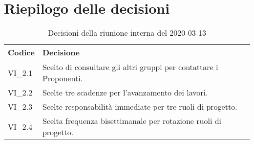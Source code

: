 \section{Riepilogo delle decisioni}
\begin{longtable}{ 
	 >{\centering}p{} >{}p{} }
	
	\caption{Decisioni della riunione interna del 2020-03-13}\\	
	
	\textbf{\color{white}Codice} & 
	\textbf{\color{white}Decisione} 
	\tabularnewline  
	\endhead
	
	VI\_2.1 & Scelto di consultare gli altri gruppi per contattare i Proponenti\ped{\textit{G}}. \\
	VI\_2.2 & Scelte tre scadenze per l'avanzamento dei lavori. \\
	VI\_2.3 & Scelte responsabilità immediate per tre ruoli di progetto. \\
	VI\_2.4 & Scelta frequenza bisettimanale per rotazione ruoli di progetto. \\
	
\end{longtable}